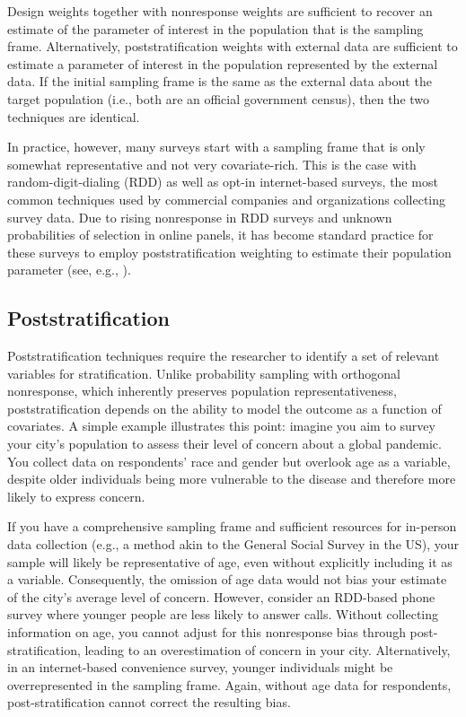 Design weights together with nonresponse weights are sufficient to recover an estimate of the parameter of interest in the population that is the sampling frame. Alternatively, poststratification weights with external data are sufficient to estimate a parameter of interest in the population represented by the external data. If the initial sampling frame is the same as the external data about the target population (i.e., both are an official government census), then the two techniques are identical.

In practice, however, many surveys start with a sampling frame that is only somewhat representative and not very covariate-rich. This is the case with random-digit-dialing (RDD) as well as opt-in internet-based surveys, the most common techniques used by commercial companies and organizations collecting survey data. Due to rising nonresponse in RDD surveys and unknown probabilities of selection in online panels, it has become standard practice for these surveys to employ poststratification weighting to estimate their population parameter (see, e.g., \citealt{dever2008internet, Battaglia2009}).

\subsection{Poststratification}

Poststratification techniques require the researcher to identify a set of relevant variables for stratification. Unlike probability sampling with orthogonal nonresponse, which inherently preserves population representativeness, poststratification depends on the ability to model the outcome as a function of covariates. A simple example illustrates this point: imagine you aim to survey your city’s population to assess their level of concern about a global pandemic. You collect data on respondents’ race and gender but overlook age as a variable, despite older individuals being more vulnerable to the disease and therefore more likely to express concern.

If you have a comprehensive sampling frame and sufficient resources for in-person data collection (e.g., a method akin to the General Social Survey in the US), your sample will likely be representative of age, even without explicitly including it as a variable. Consequently, the omission of age data would not bias your estimate of the city’s average level of concern. However, consider an RDD-based phone survey where younger people are less likely to answer calls. Without collecting information on age, you cannot adjust for this nonresponse bias through post-stratification, leading to an overestimation of concern in your city. Alternatively, in an internet-based convenience survey, younger individuals might be overrepresented in the sampling frame. Again, without age data for respondents, post-stratification cannot correct the resulting bias.

